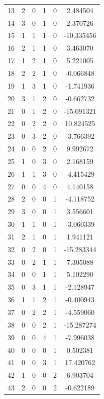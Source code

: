 \documentclass[preprint,12pt]{elsarticle}
\begin{document}
\begin{table}[h!]
\begin{minipage}[h!]{0.23\textwidth}
{\begin{tabular}{|c|ccccc|}
13  &   2 &   0 &   1 &   0 &    2.484504 \\
14  &   3 &   0 &   1 &   0 &    2.370726 \\
15  &   1 &   1 &   1 &   0 &  -10.335456 \\
16  &   2 &   1 &   1 &   0 &    3.463070 \\
17  &   1 &   2 &   1 &   0 &    5.221005 \\
18  &   2 &   2 &   1 &   0 &   -0.066848 \\
19  &   1 &   3 &   1 &   0 &   -1.741936 \\
20  &   3 &   1 &   2 &   0 &   -0.662732 \\
21  &   0 &   1 &   2 &   0 &  -15.091321 \\
22  &   0 &   2 &   2 &   0 &   10.824525 \\
23  &   0 &   3 &   2 &   0 &   -3.766392 \\
24  &   0 &   0 &   2 &   0 &    9.992672 \\
25  &   1 &   0 &   3 &   0 &    2.168159 \\
26  &   1 &   1 &   3 &   0 &   -4.415429 \\
27  &   0 &   0 &   4 &   0 &    4.140158 \\
28  &   2 &   0 &   0 &   1 &   -4.118752 \\
29  &   3 &   0 &   0 &   1 &    3.556601 \\
30  &   1 &   1 &   0 &   1 &   -3.060339 \\
31  &   2 &   1 &   0 &   1 &    1.941121 \\
32  &   0 &   2 &   0 &   1 &  -15.283344 \\
33  &   0 &   2 &   1 &   1 &    7.305088 \\
34  &   0 &   0 &   1 &   1 &    5.102290 \\
35  &   0 &   3 &   1 &   1 &   -2.128947 \\
36  &   1 &   1 &   2 &   1 &   -0.400943 \\
37  &   0 &   2 &   2 &   1 &   -4.559060 \\
38  &   0 &   0 &   2 &   1 &  -15.287274 \\
39  &   0 &   0 &   4 &   1 &   -7.996038 \\
40  &   0 &   0 &   0 &   1 &    0.502381 \\
41  &   0 &   0 &   3 &   1 &   17.420762 \\
42  &   1 &   0 &   0 &   2 &    6.903704 \\
43  &   2 &   0 &   0 &   2 &   -0.622189 \\

\end{tabular}}
\end{minipage}
\end{table}
\end{document}
